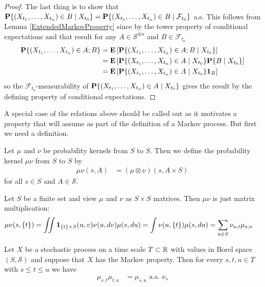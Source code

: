 \begin{proof}
The last thing is to show that
$\cprobability{X_{t_0}}{(X_{t_1},\dotsc, X_{t_n}) \in B} =
\cprobability{\mathcal{F}_{t_0}}{(X_{t_1},\dotsc, X_{t_n}) \in B}$
a.s.  This follows from Lemma \ref{ExtendedMarkovProperty} since by
the tower property of conditional expectations and that result 
for any $A \in \mathcal{S}^{\otimes n}$ and $B \in \mathcal{F}_{t_0}$
\begin{align*}
\probability{(X_{t_1}, \dotsc, X_{t_n}) \in A ; B} 
&=\expectation{\cprobability{X_{t_0}}{(X_{t_1}, \dotsc, X_{t_n}) \in A ;  B}} \\
&=\expectation{\cprobability{X_{t_0}}{(X_{t_1}, \dotsc, X_{t_n}) \in A}
\cprobability{X_{t_0}}{B}} \\
&=\expectation{\cprobability{X_{t_0}}{(X_{t_1}, \dotsc, X_{t_n}) \in A}
\characteristic{B}} \\
\end{align*}
so the $\mathcal{F}_{t_0}$-measurability of
$\cprobability{X_{t_0}}{(X_{t_1}, \dotsc, X_{t_n}) \in A}$ gives the
result by the defining property of conditional expectations.
\end{proof}
A special case of the relations above should be called out as it
motivates a property that will assume as part of the definition of a
Markov process.  But first we need a definition.
\begin{defn}Let $\mu$ and $\nu$ be probability kernels from $S$ to
  $S$.  Then we define the probability kernel $\mu \nu$ from $S$ to
  $S$ by
\begin{align*}
\mu \nu (s, A) &= (\mu \otimes \nu)(s, A \times S)
\end{align*}
for all $s \in S$ and $A \in \mathcal{S}$.
\end{defn}
\begin{examp}
Let $S$ be a finite set and view $\mu$ and $\nu$ as $S \times S$
matrices.  Then $\mu \nu$ is just matrix multiplication:
\begin{align*}
\mu \nu (s, \lbrace t \rbrace) 
&= \iint \characteristic{\lbrace t  \rbrace \times S}(u,v) \nu(u, dv) \mu(s, du) 
=\int \nu(u, \lbrace t \rbrace) \mu(s,du) 
=\sum_{u \in S} \nu_{u, t} \mu_{s, u}
\end{align*}
\end{examp}
\begin{cor}\label{ChapmanKolmogorovWeak}Let $X$ be a stochastic
  process on a time scale $T \subset \reals$ with values in Borel
  space $(S, \mathcal{S})$ and suppose that $X$ has the Markov
  property.  Then for every $s, t, u \in T$ with $s \leq t \leq u$ we
  have
\begin{align*}
\mu_{s,t} \mu_{t,u} &= \mu_{s,u} \text{ a.s. $\nu_s$}
\end{align*}
\end{cor}
